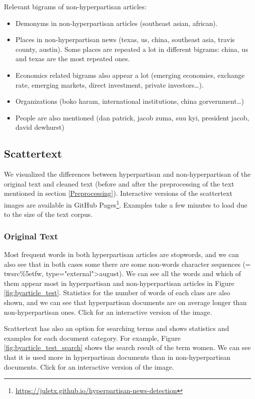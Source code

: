 \documentclass[11pt,a4paper]{article}
\begin{document}
Relevant bigrams of non-hyperpartisan articles:

\begin{itemize}
\item
  Demonyms in non-hyperpartisan articles (southeast asian, african).
\item
  Places in non-hyperpartisan news (texas, us, china, southeast asia,
  travis county, austin). Some places are repeated a lot in different
  bigrams: china, us and texas are the most repeated ones.
\item
  Economics related bigrams also appear a lot (emerging economies,
  exchange rate, emerging markets, direct investment, private
  investors\ldots).
\item
  Organizations (boko haram, international institutions, china
  gorvernment\ldots)
\item
  People are also mentioned (dan patrick, jacob zuma, suu kyi, president
  jacob, david dewhurst)
\end{itemize}

\subsection{Scattertext}

We visualized the differences between hyperpartisan and non-hyperpartisan of the original text and cleaned text (before and after the preprocessing of the text mentioned in section \ref{Preprocessing}). Interactive versions of the scattertext images are available in GitHub Pages\footnote{\url{https://juletx.github.io/hyperpartisan-news-detection}}. Examples take a few minutes to load due to the size of the text corpus.

\subsubsection{Original Text}

Most frequent words in both hyperpartisan articles are stopwords, and we can also see that in both cases some there are some non-words character sequences (= twsrc\%5etfw, type="external">august). We can see all the words and which of them appear most in hyperpartisan and non-hyperpartisan articles in Figure \ref{fig:byarticle_test}. Statistics for the number of words of each class are also shown, and we can see that hyperpartisan documents are on average longer than non-hyperpartisan ones. Click for an interactive version of the image.

Scattertext has also an option for searching terms and shows statistics and examples for each document category. For example, Figure \ref{fig:byarticle_test_search} shows the search result of the term women. We can see that it is used more in hyperpartisan documents than in non-hyperpartisan documents. Click for an interactive version of the image.
\end{document}
